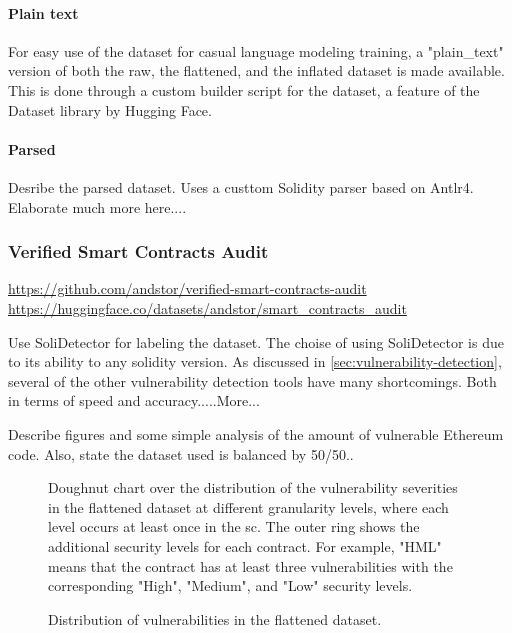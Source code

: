 \paragraph{Plain text}
\label{sec:verified-smart-contracts-plain-text}
For easy use of the dataset for casual language modeling training, a "plain\_text" version of both the raw, the flattened, and the inflated dataset is made available. This is done through a custom builder script for the dataset, a feature of the Dataset library by Hugging Face.

\paragraph{Parsed}
\label{sec:verified-smart-contracts-parsed}
Desribe the parsed dataset. Uses a custtom Solidity parser based on  Antlr4. Elaborate much more here....

\subsubsection{Verified Smart Contracts Audit}
\label{sec:verified-smart-contracts-audit}

\url{https://github.com/andstor/verified-smart-contracts-audit}
\url{https://huggingface.co/datasets/andstor/smart_contracts_audit}


Use  SoliDetector for labeling the dataset. The choise of using SoliDetector is due to its ability to any solidity version. As discussed in \cref{sec:vulnerability-detection}, several of the other vulnerability detection tools have many shortcomings. Both in terms of speed and accuracy.....More...

Describe figures and some simple analysis of the amount of vulnerable Ethereum code. Also, state the dataset used is balanced by 50/50..

\begin{figure}[htbp]
    \centering
    
    \caption{Doughnut chart over the distribution of the vulnerability severities in the flattened dataset at different granularity levels, where each level occurs at least once in the \acrshort{sc}. The outer ring shows the additional security levels for each contract. For example, "HML" means that the contract has at least three vulnerabilities with the corresponding "High", "Medium", and "Low" security levels.}
\end{figure}


\begin{figure}[htbp]
    \centering
    
    \caption{Distribution of vulnerabilities in the flattened dataset.}
\end{figure}



